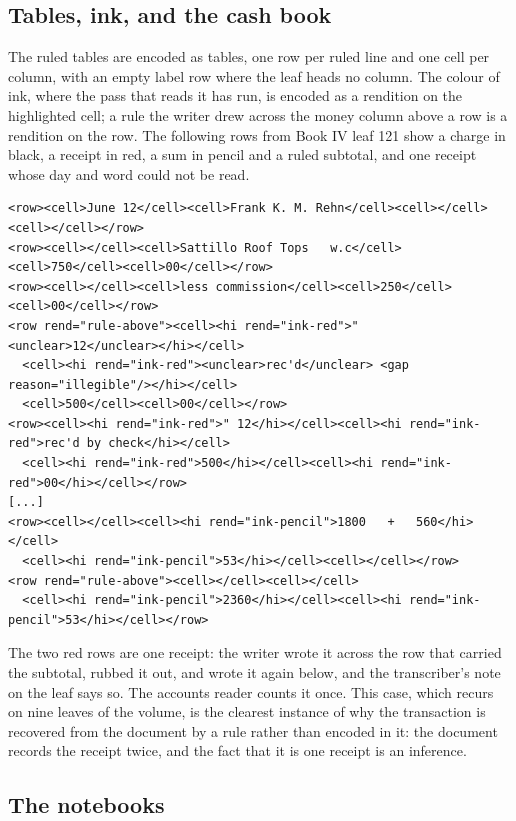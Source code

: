 \documentclass[11pt]{article}
\begin{document}
\subsection{Tables, ink, and the cash book}

The ruled tables are encoded as tables, one row per ruled line and one cell per column, with an empty label row where the leaf heads no column. The colour of ink, where the pass that reads it has run, is encoded as a rendition on the highlighted cell; a rule the writer drew across the money column above a row is a rendition on the row. The following rows from Book IV leaf 121 show a charge in black, a receipt in red, a sum in pencil and a ruled subtotal, and one receipt whose day and word could not be read.

\begin{lstlisting}
<row><cell>June 12</cell><cell>Frank K. M. Rehn</cell><cell></cell><cell></cell></row>
<row><cell></cell><cell>Sattillo Roof Tops   w.c</cell><cell>750</cell><cell>00</cell></row>
<row><cell></cell><cell>less commission</cell><cell>250</cell><cell>00</cell></row>
<row rend="rule-above"><cell><hi rend="ink-red">" <unclear>12</unclear></hi></cell>
  <cell><hi rend="ink-red"><unclear>rec'd</unclear> <gap reason="illegible"/></hi></cell>
  <cell>500</cell><cell>00</cell></row>
<row><cell><hi rend="ink-red">" 12</hi></cell><cell><hi rend="ink-red">rec'd by check</hi></cell>
  <cell><hi rend="ink-red">500</hi></cell><cell><hi rend="ink-red">00</hi></cell></row>
[...]
<row><cell></cell><cell><hi rend="ink-pencil">1800   +   560</hi></cell>
  <cell><hi rend="ink-pencil">53</hi></cell><cell></cell></row>
<row rend="rule-above"><cell></cell><cell></cell>
  <cell><hi rend="ink-pencil">2360</hi></cell><cell><hi rend="ink-pencil">53</hi></cell></row>
\end{lstlisting}

The two red rows are one receipt: the writer wrote it across the row that carried the subtotal, rubbed it out, and wrote it again below, and the transcriber's note on the leaf says so. The accounts reader counts it once. This case, which recurs on nine leaves of the volume, is the clearest instance of why the transaction is recovered from the document by a rule rather than encoded in it: the document records the receipt twice, and the fact that it is one receipt is an inference.

\subsection{The notebooks}
\end{document}
